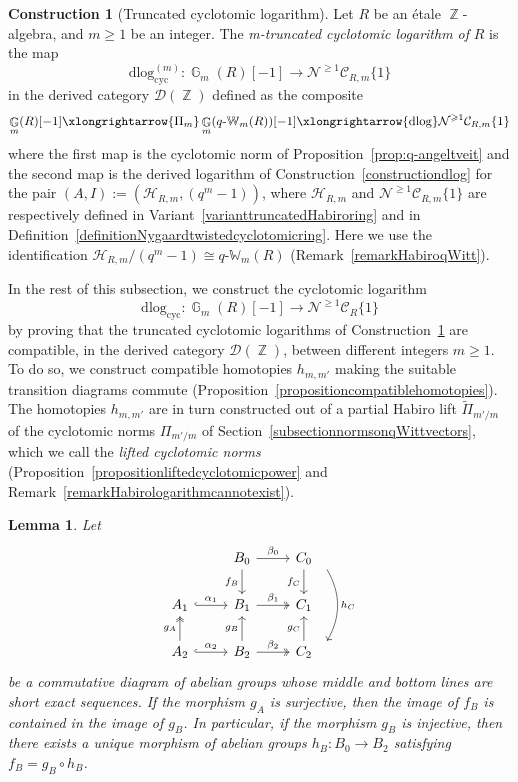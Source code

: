 \documentclass[10pt,twoside]{scrarticle}
\newlength{\mar} \setlength{\mar}{1cm}%
\newlength{\len}
\newtheorem{lemma}[theorem]{Lemma}
\theoremstyle{definition}
\newtheorem{construction}[theorem]{Construction}
\DeclareMathOperator{\Z}{\mathbb{Z}}
\DeclareMathOperator{\G}{\mathbb{G}}
\newcommand{\CR}{\mathcal{C}_{R}}
\newcommand{\CRm}{\mathcal{C}_{R,m}}
\newcommand{\Cyc}{\mathrm{cyc}}
\newcommand{\qW}{q\text{-}\mathbb{W}}
\newcommand{\qWm}{q\text{-}\mathbb{W}_m}
\renewcommand{\ge}{\geqslant}
\newcommand{\dlog}{\mathrm{dlog}}
\numberwithin{equation}{theorem}
\begin{document}
\begin{construction}[Truncated cyclotomic logarithm]\label{constructiontruncatedcyclotomiclogarithm}
    Let $R$ be an étale $\Z$-algebra, and $m \ge 1$ be an integer. The \emph{m-truncated cyclotomic logarithm of} $R$ is the map
    $$\dlog_{\Cyc}^{(m)} : \G_m(R)[-1] \longrightarrow \mathcal{N}^{\ge 1}\CRm\{1\}$$
    in the derived category $\mathcal{D}(\Z)$ defined as the composite
    $$\G_m(R)[-1] \xlongrightarrow{\Pi_m} \G_m(\qW_m(R))[-1] \xlongrightarrow{\dlog} \mathcal{N}^{\ge 1}\CRm\{1\}$$
    where the first map is the cyclotomic norm of Proposition~\ref{prop:q-angeltveit} and the second map is the derived logarithm of Construction~\ref{constructiondlog} for the pair $(A,I) := (\mathcal{H}_{R,m},(q^m-1))$, where $\mathcal{H}_{R,m}$ and $\mathcal{N}^{\ge 1}\CRm\{1\}$ are respectively defined in Variant~\ref{varianttruncatedHabiroring} and in Definition~\ref{definitionNygaardtwistedcyclotomicring}. Here we use the identification $\mathcal{H}_{R,m}/(q^m-1)\cong\qWm(R)$ (Remark~\ref{remarkHabiroqWitt}).
\end{construction}

In the rest of this subsection, we construct the cyclotomic logarithm
$$\dlog_{\Cyc} : \G_m(R)[-1] \longrightarrow \mathcal{N}^{\ge 1} \CR\{1\}$$
by proving that the truncated cyclotomic logarithms of Construction~\ref{constructiontruncatedcyclotomiclogarithm} are compatible, in the derived category $\mathcal{D}(\Z)$, between different integers $m \ge 1$. To do so, we construct compatible homotopies $h_{m,m'}$ making the suitable transition diagrams commute (Proposition~\ref{propositioncompatiblehomotopies}). 
The homotopies $h_{m,m'}$ are in turn constructed out of a partial Habiro lift $\tilde{\Pi}_{m'/m}$ of the cyclotomic norms $\Pi_{m'/m}$ of Section~\ref{subsectionnormsonqWittvectors}, which we call the \emph{lifted cyclotomic norms} (Proposition~\ref{propositionliftedcyclotomicpower} and Remark~\ref{remarkHabirologarithmcannotexist}).

\begin{lemma}\label{lemmadiagramchase}
    Let 
    \[\begin{tikzcd}
	& {B_0} & {C_0} \\
	{A_1} & {B_1} & {C_1} \\
	{A_2} & {B_2} & {C_2}
	\arrow["{\beta_0}", from=1-2, to=1-3]
	\arrow["{f_B}"', from=1-2, to=2-2]
	\arrow["{f_C}"', from=1-3, to=2-3]
	\arrow["{h_C}", shift left=5, bend right=-30pt, from=1-3, to=3-3]
	\arrow["{\alpha_1}", hook, from=2-1, to=2-2]
	\arrow["{\beta_1}", two heads, from=2-2, to=2-3]
	\arrow["{g_A}", two heads, from=3-1, to=2-1]
	\arrow["{\alpha_2}", hook, from=3-1, to=3-2]
	\arrow["{g_B}", from=3-2, to=2-2]
	\arrow["{\beta_2}", two heads, from=3-2, to=3-3]
	\arrow["{g_C}", from=3-3, to=2-3]
    \end{tikzcd}\]
    be a commutative diagram of abelian groups whose middle and bottom lines are short exact sequences. If the morphism $g_A$ is surjective, then the image of $f_B$ is contained in the image of $g_B$. In particular, if the morphism $g_B$ is injective, then there exists a unique morphism of abelian groups $h_B : B_0 \rightarrow B_2$ satisfying $f_B=g_B \circ h_B$.
\end{lemma}
\end{document}

